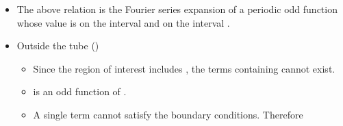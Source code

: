 \begin{ELexample}{}
\begin{ELsolution}
\begin{itemize}
\tightlist
\item
  The above relation is the Fourier series expansion of a periodic odd function whose value is  on the interval  and  on the interval \ELim{\pi<\phi<2\pi}.
\end{itemize}


\begin{itemize}
\tightlist
\item
  Outside the tube ()

  \begin{itemize}
  \tightlist
  \item
    Since the region of interest includes , the terms containing  cannot exist.
  \item
     is an odd function of \ELim{\phi}.
  \item
    A single term cannot satisfy the boundary conditions. Therefore
  \end{itemize}
\end{itemize}


\begin{ELimportant}{}


\end{ELimportant}

\end{ELsolution}

\end{ELexample}
